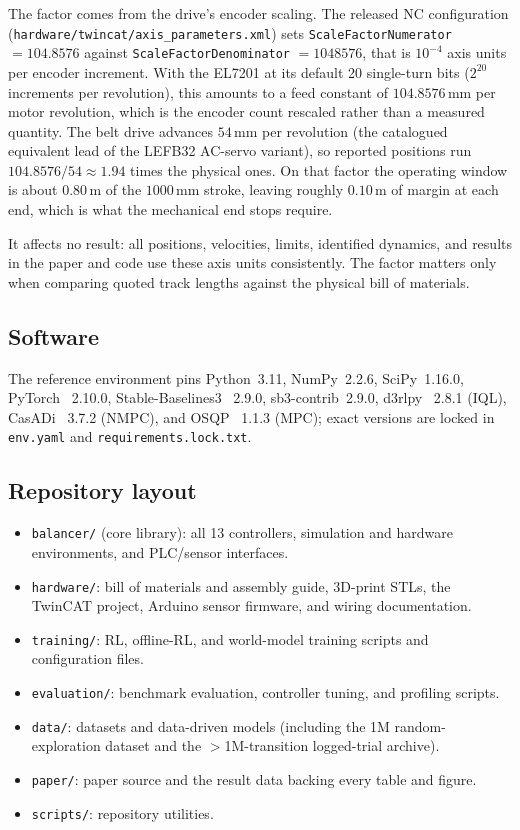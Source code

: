 The factor comes from the drive's encoder scaling. The released NC
configuration (\texttt{hardware/twincat/axis\_parameters.xml}) sets
\texttt{ScaleFactorNumerator} $= 104.8576$ against
\texttt{ScaleFactorDenominator} $= 1048576$, that is $10^{-4}$ axis
units per encoder increment. With the EL7201 at its default 20
single-turn bits ($2^{20}$ increments per revolution), this amounts to
a feed constant of $104.8576$\,mm per motor revolution, which is the
encoder count rescaled rather than a measured quantity. The belt drive
advances $54$\,mm per revolution (the catalogued equivalent lead of the
LEFB32 AC-servo variant), so reported positions run
$104.8576/54 \approx 1.94$ times the physical ones. On that factor the
operating window is about $0.80$\,m of the $1000$\,mm stroke, leaving
roughly $0.10$\,m of margin at each end, which is what the mechanical
end stops require.

It affects
no result: all positions, velocities, limits, identified dynamics, and
results in the paper and code use these axis units consistently. The
factor matters only when comparing quoted track lengths against the
physical bill of materials.

\subsection{Software}

The reference environment pins Python~3.11, NumPy~2.2.6, SciPy~1.16.0,
PyTorch~\cite{paszke2019pytorch} 2.10.0, Stable-Baselines3~\cite{stable_baselines3} 2.9.0,
sb3-contrib~2.9.0, d3rlpy~\cite{seno2022d3rlpy} 2.8.1 (IQL), CasADi~\cite{casadi} 3.7.2 (NMPC),
and OSQP~\cite{osqp} 1.1.3 (MPC); exact versions are locked in \texttt{env.yaml} and
\texttt{requirements.lock.txt}.

\subsection{Repository layout}

\begin{itemize}
  \item \texttt{balancer/} (core library): all 13 controllers, simulation and hardware environments, and PLC/sensor interfaces.
  \item \texttt{hardware/}: bill of materials and assembly guide, 3D-print STLs, the TwinCAT project, Arduino sensor firmware, and wiring documentation.
  \item \texttt{training/}: RL, offline-RL, and world-model training scripts and configuration files.
  \item \texttt{evaluation/}: benchmark evaluation, controller tuning, and profiling scripts.
  \item \texttt{data/}: datasets and data-driven models (including the 1M random-exploration dataset and the ${>}$1M-transition logged-trial archive).
  \item \texttt{paper/}: paper source and the result data backing every table and figure.
  \item \texttt{scripts/}: repository utilities.
\end{itemize}


